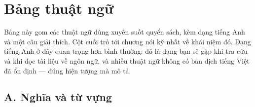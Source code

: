 \documentclass[english.tex]{subfiles}
\begin{document}
\chapter*{Bảng thuật ngữ}

\begin{tomtat}
Bảng này gom các thuật ngữ dùng xuyên suốt quyển sách, kèm dạng tiếng Anh và một câu giải thích. Cột cuối trỏ tới chương nói kỹ nhất về khái niệm đó. Dạng tiếng Anh ở đây quan trọng hơn bình thường: đó là dạng bạn sẽ gặp khi tra cứu và khi đọc tài liệu về ngôn ngữ, và nhiều thuật ngữ không có bản dịch tiếng Việt đã ổn định --- đúng hiện tượng mà  mô tả.
\end{tomtat}

\section*{A. Nghĩa và từ vựng}
\end{document}
